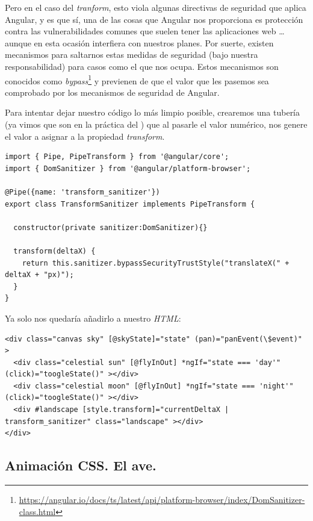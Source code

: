 Pero en el caso del \emph{tranform}, esto viola algunas directivas de seguridad que aplica Angular, y es que sí, una de las cosas que Angular nos proporciona es protección contra las vulnerabilidades comunes que suelen tener las aplicaciones web \ldots aunque en esta ocasión interfiera con nuestros planes. Por suerte, existen mecanismos para saltarnos estas medidas de seguridad (bajo nuestra responsabilidad) para casos como el que nos ocupa. Estos mecanismos son conocidos como \emph{bypass}\footnote{\url{https://angular.io/docs/ts/latest/api/platform-browser/index/DomSanitizer-class.html}} y previenen de que el valor que les pasemos sea comprobado por los mecanismos de seguridad de Angular.

Para intentar dejar nuestro código lo más limpio posible, crearemos una tubería (ya vimos que son en la práctica del ) que al pasarle el valor numérico, nos genere el valor a asignar a la propiedad \emph{transform}.

{\begin{lstlisting}[style=htmlcssjs,frame=tlrb, xleftmargin={0.2cm}]
import { Pipe, PipeTransform } from '@angular/core';
import { DomSanitizer } from '@angular/platform-browser';

@Pipe({name: 'transform_sanitizer'})
export class TransformSanitizer implements PipeTransform {

  constructor(private sanitizer:DomSanitizer){}

  transform(deltaX) {
    return this.sanitizer.bypassSecurityTrustStyle("translateX(" + deltaX + "px)");
  }
}
\end{lstlisting}}

Ya solo nos quedaría añadirlo a nuestro \emph{HTML}:

{\begin{lstlisting}[style=htmlcssjs,frame=tlrb, xleftmargin={0.2cm}]
<div class="canvas sky" [@skyState]="state" (pan)="panEvent(\$event)" >
  <div class="celestial sun" [@flyInOut] *ngIf="state === 'day'" (click)="toogleState()" ></div>
  <div class="celestial moon" [@flyInOut] *ngIf="state === 'night'" (click)="toogleState()" ></div>
  <div #landscape [style.transform]="currentDeltaX | transform_sanitizer" class="landscape" ></div>
</div>
\end{lstlisting}}

\subsection{Animación CSS. El ave.}

